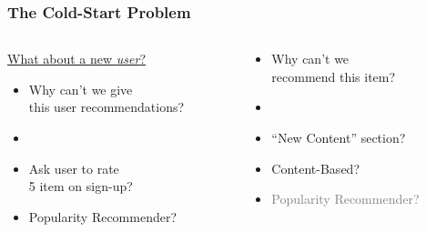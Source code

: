 \documentclass[xcolor={dvipsnames}]{beamer}
\begin{document}
{\begin{columns}
\begin{column}{.5\textwidth}
\end{column}
\end{columns}




}



\frame
{
\frametitle{The Cold-Start Problem}



\begin{columns}
\begin{column}{.5\textwidth}



\underline{What about a new \emph{user}?}

\begin{itemize}
\item<2-> Why can't we give\\ this user recommendations?
\item[]
\item<3-> Ask user to rate \\5 item  on sign-up?
\item<4-> Popularity Recommender?
\end{itemize}



\end{column}
\begin{column}{.5\textwidth}



\begin{itemize}
\item<5-> Why can't we \\ recommend this item?
\item[]
\item<6-> ``New Content'' section? 
\item<7-> Content-Based? 
\item<7-> \textcolor{gray}{Popularity Recommender?}
\end{itemize}

\end{column}
\end{columns}



}
\end{document}
